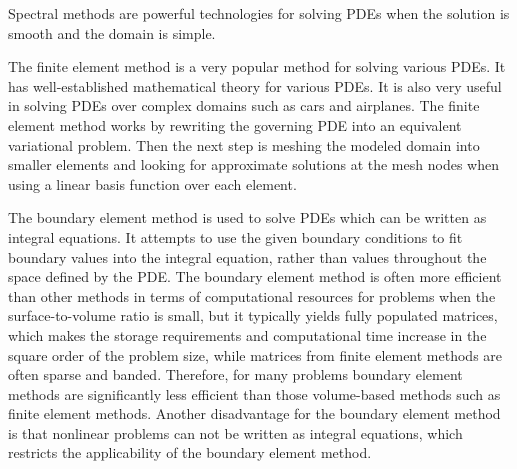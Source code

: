 \documentclass[a4paper,10pt,twoside]{article}
\begin{document}
Spectral methods are powerful technologies for solving PDEs when the solution is smooth and the domain is simple. %

The finite element method is a very popular method for solving
various PDEs. It has well-established mathematical
theory for various PDEs. It is also very useful in solving PDEs over
complex domains such as cars and airplanes. The finite element method works
by rewriting the governing PDE into an equivalent variational problem. Then the next step is meshing
the modeled domain into smaller elements and looking for approximate
solutions at the mesh nodes when using a linear basis function over each element.

The boundary element method is used to solve PDEs which can be
written as integral equations. It attempts
to use the given boundary conditions to fit boundary values into the integral
equation, rather than values throughout the space defined by the PDE. The boundary element method
is often more efficient than other methods in terms of computational resources
for problems when the surface-to-volume ratio is small, but it typically yields fully populated matrices, which makes
the storage requirements and computational time increase in the square order
of the problem size, while matrices from finite element methods are
often sparse and banded. Therefore, for many problems boundary element methods
are significantly less efficient than those volume-based methods such as finite
element methods. Another disadvantage for the boundary element method
is that nonlinear problems can not be written as integral equations, which restricts the applicability of the boundary element
method.

\end{document}
